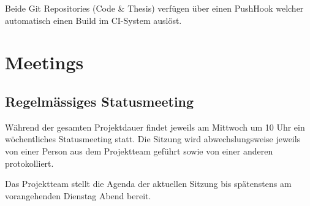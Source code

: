 Beide Git Repositories (Code \& Thesis) verfügen über einen \gls{PushHook} welcher automatisch einen Build im CI-System auslöst.



\section{Meetings}
\subsection{Regelmässiges Statusmeeting}
Während der gesamten Projektdauer findet jeweils am Mittwoch um 10 Uhr ein wöchentliches Statusmeeting statt. Die Sitzung wird abwechslungsweise jeweils von einer Person aus dem Projektteam geführt sowie von einer anderen protokolliert.

Das Projektteam stellt die Agenda der aktuellen Sitzung bis spätenstens am vorangehenden Dienstag Abend bereit.